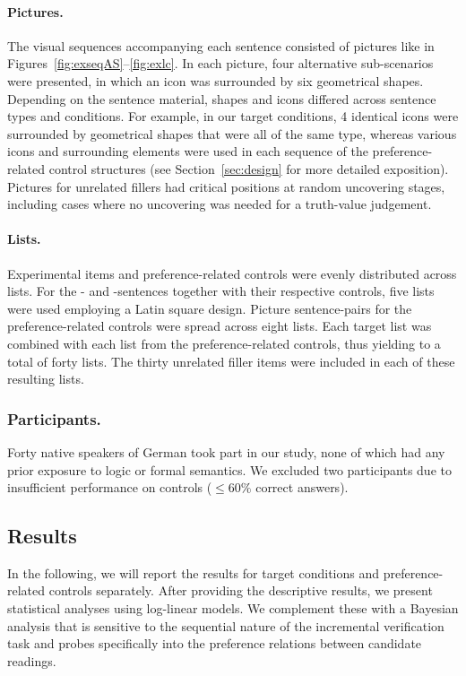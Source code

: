 \documentclass[fleqn,reqno,10pt]{article}
\newcommand{\as}{\acro{as}}
\renewcommand{\es}{\acro{es}}
\begin{document}
\paragraph{Pictures.}
The visual sequences accompanying each sentence consisted of pictures
like in Figures~\ref{fig:exseqAS}--\ref{fig:exlc}. In each picture,
four alternative sub-scenarios were presented, in which an icon was
surrounded by six geometrical shapes. Depending on the sentence
material, shapes and icons differed across sentence types and
conditions. For example, in our target conditions, 4 identical icons
were surrounded by geometrical shapes that were all of the same type,
whereas various icons and surrounding elements were used in each
sequence of the preference-related control structures (see
Section~\ref{sec:design} for more detailed exposition). Pictures for
unrelated fillers had critical positions at random uncovering stages,
including cases where no uncovering was needed for a truth-value
judgement.

\paragraph{Lists.}
Experimental items and preference-related controls were evenly
distributed across lists. For the \as- and \es-sentences together with
their respective controls, five lists were used employing a Latin
square design. Picture sentence-pairs for the preference-related
controls were spread across eight lists. Each target list was combined
with each list from the preference-related controls, thus yielding to
a total of forty lists. The thirty unrelated filler items were
included in each of these resulting lists.

\subsubsection{Participants.} 

Forty native speakers of German took part in our study, none of which
had any prior exposure to logic or formal semantics. We excluded two
participants due to insufficient performance on controls ($\le 60\%$
correct answers).

\subsection{Results}
\label{sec:results}

In the following, we will report the results for target conditions and
preference-related controls separately. After providing the
descriptive results, we present statistical analyses using log-linear
models. We complement these with a Bayesian analysis that is sensitive
to the sequential nature of the incremental verification task and
probes specifically into the preference relations between candidate
readings.
\end{document}
